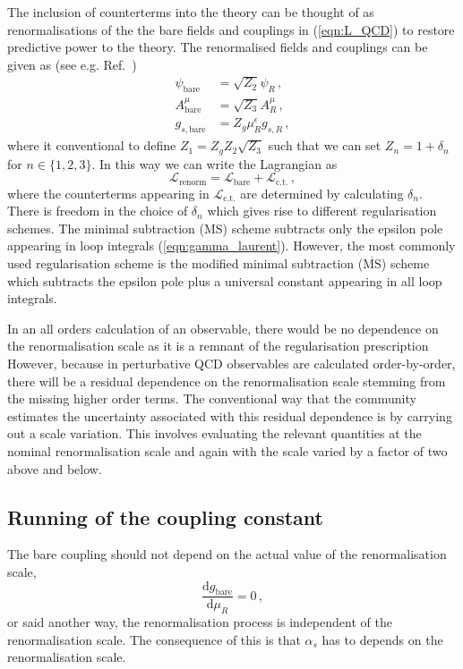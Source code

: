 \documentclass[main.tex]{subfiles}
\begin{document}
    The inclusion of counterterms into the theory can be
    thought of as renormalisations of the the bare fields
    and couplings in (\ref{eqn:L_QCD}) to restore predictive
    power to the theory. The renormalised fields and couplings
    can be given as (see e.g. Ref.~\cite{mangano1999introduction})
    \begin{align}\label{eqn:renormlised_fields}
        \psi_{\mathrm{bare}} &= \sqrt{Z_{2}} \psi_{R} \, , \nonumber \\
        A_{\mathrm{bare}}^{\mu} &= \sqrt{Z_{3}} A_{R}^{\mu} \, ,\\
        g_{s,\mathrm{bare}} &= Z_{g} \mu_{R}^{\epsilon} g_{s,R} \, , \nonumber
    \end{align}
    where it conventional to define $Z_{1} = Z_{g}Z_{2}\sqrt{Z_{3}}$
    such that we can set $Z_{n} = 1 + \delta_{n}$ for $n \in \{1, 2, 3\}$.
    In this way we can write the Lagrangian as
    \begin{equation}
        \mathcal{L}_{\mathrm{renorm}} = \mathcal{L}_{\mathrm{bare}} + \mathcal{L}_{\mathrm{c.t.}} \, ,
    \end{equation}
    where the counterterms appearing in $\mathcal{L}_{\mathrm{c.t.}}$
    are determined by calculating $\delta_{n}$. There is freedom
    in the choice of $\delta_{n}$ which gives rise to
    different regularisation schemes. The minimal subtraction
    (MS) scheme subtracts only the epsilon pole appearing
    in loop integrals (\ref{eqn:gamma_laurent}). However, the most
    commonly used regularisation scheme is the modified minimal
    subtraction ($\overline{\mathrm{MS}}$) scheme which subtracts the
    epsilon pole plus a universal constant appearing in all
    loop integrals.

    In an all orders calculation of an observable,
    there would be no dependence on the renormalisation
    scale as it is a remnant of the regularisation prescription
    However, because in perturbative QCD observables
    are calculated order-by-order, there will be a residual
    dependence on the renormalisation scale stemming from
    the missing higher order terms. The conventional way
    that the community estimates the uncertainty associated
    with this residual dependence is by carrying out
    a scale variation. This involves evaluating the
    relevant quantities at the nominal renormalisation
    scale and again with the scale varied by a factor of
    two above and below.


\subsection{Running of the coupling constant}\label{sec:alpha_running}
    The bare coupling should not depend on the actual
    value of the renormalisation scale,
    \begin{equation}\label{eqn:d_g_bare_d_mu}
        \dfrac{\mathrm{d}g_{\mathrm{bare}}}{\mathrm{d}\mu_{R}} = 0 \, ,
    \end{equation}
    or said another way, the renormalisation process
    is independent of the renormalisation scale. The
    consequence of this is that $\alpha_{s}$ has to
    depends on the renormalisation scale.
\end{document}
